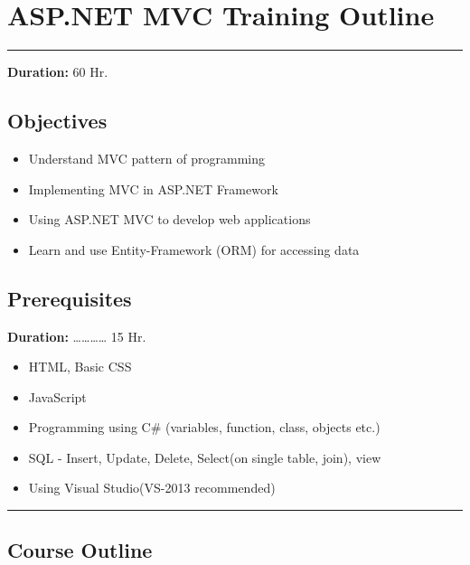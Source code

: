 \documentclass[12pt,a4paper]{article}
\begin{document}
\section*{ASP.NET MVC Training Outline}

\rule{15cm}{0.4pt}

\indent\textbf{Duration:} 60 Hr.

\subsection*{Objectives}

\begin{itemize}
	\item Understand MVC pattern of programming
	\item Implementing MVC in ASP.NET Framework
	\item Using ASP.NET MVC to develop web applications
	\item Learn and use Entity-Framework (ORM) for accessing data 
\end{itemize}

\subsection*{Prerequisites}

\textbf{Duration:} \dots{}\dots{}\dots{}\dots{} 15 Hr.
\begin{itemize}
	\item HTML, Basic CSS
    \item JavaScript
	\item Programming using C\# 
        (variables, function, class, objects etc.)
    \item SQL - Insert, Update, Delete, Select(on single table, join), view
    \item Using Visual Studio(VS-2013 recommended)
\end{itemize}

\noindent\rule{15cm}{0.4pt}

\subsection*{Course Outline}
\end{document}

